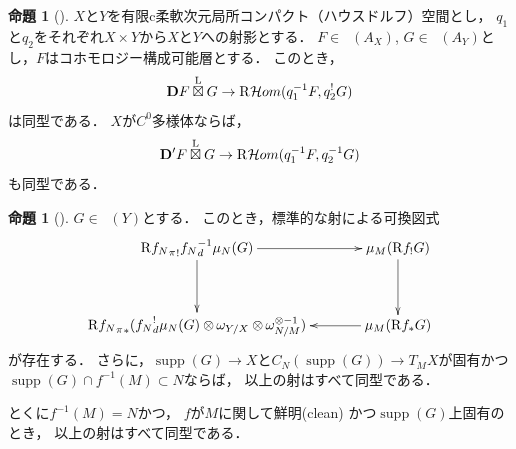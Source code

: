 \documentclass[leqno, 10pt, a4paper, dvipdfmx]{jsarticle}
\theoremstyle{definition}
\numberwithin{equation}{section}
\newcommand{\supp}{\mathop{\mathrm{supp}}\nolimits}
\newcommand{\Dompb}{\mathop{\mathsf{D}^\mathrm{b}}\nolimits}
\newcommand{\HOM}{\mathop{\mathcal{H}\hspace{-0pt}om}\nolimits}%
\newcommand{\RHOM}{\mathop{\mathrm{R}\hspace{-1.5pt}\HOM}\nolimits}
\newcommand{\Rder}{\mathrm{R}}
\newcommand{\vD}{\mathbf{D}}
\newcommand{\tens}[1][]{\mathbin{\otimes_{\raise1.5ex\hbox to-.1em{}{#1}}}}
\newcommand{\etens}{\mathbin{\boxtimes}}
\newcommand{\letens}{\overset{\mathrm{L}}{\etens}}
\theoremstyle{mystyle}
\newtheorem{PRP}[AXM]{命題}
\renewenvironment{leftbar}{%
  \def\FrameCommand{\textcolor{lightgray}{\vrule width 4pt} \hspace{10pt}}%
  \MakeFramed {\advance\hsize-\width \FrameRestore}}%
{\endMakeFramed}
\newcommand{\mpb}[1][]{{#1}_{\pi}} %
\newcommand{\mdiff}[1][]{{#1}_{d}} %
\begin{document}
\begin{leftbar}
\begin{PRP}[{\cite[Prop.3.4.4.]{KS90}}]\label{prp3.4.4}
  \(X\)と\(Y\)を有限c柔軟次元局所コンパクト（ハウスドルフ）空間とし，
  \(q_1\)と\(q_2\)をそれぞれ\(X\times Y\)から\(X\)と\(Y\)への射影とする．
  \(F\in\Dompb(A_X)\), \(G\in\Dompb(A_Y)\)とし，\(F\)はコホモロジー構成可能層とする．
  このとき，
  \[
    \vD{F}\letens G\to \RHOM(q_1^{-1}F,q_2^{!}G)
  \]は同型である．
  \(X\)が\(C^0\)多様体ならば，\[
    \vD'{F}\letens G\to \RHOM(q_1^{-1}F,q_2^{-1}G)
  \]も同型である．
\end{PRP}
\end{leftbar}

\begin{leftbar}
\begin{PRP}[{\cite[Prop.4.3.4]{KS90}}]\label{prp4.3.4}
  \(G\in\Dompb(Y)\)とする．
  このとき，標準的な射による可換図式    
  \[    
      \vcenter{\xymatrix@C=36pt@R=36pt{
      \Rder{{\mpb[f_{N}]}_{!}}{\mdiff[f_{N}]^{-1}}\mu_{N}(G)
      \ar[d]
      \ar[r]
      &
      \mu_{M}(\Rder{f_{!}}G)
      \ar[d]
      \\
      \Rder{{\mpb[f_{N}]}_{\ast}}({\mdiff[f_{N}]^{!}}\mu_{N}(G)\tens[]\omega_{Y/X}\tens[]\omega_{N/M}^{\otimes{-1}})
      &
      \mu_{M}(\Rder{f_{\ast}}G)
      \ar[l]
      }}
  \]が存在する．
  さらに，\(\supp(G)\to X\)と\(
      C_N(\supp(G))\to T_{M}X
  \)が固有かつ\(\supp(G)\cap f^{-1}(M)\subset N\)ならば，
  以上の射はすべて同型である．
  
  とくに\(f^{-1}(M)=N\)かつ，
  \(f\)が\(M\)に関して鮮明\footnotemark[2] (clean) かつ\(\supp(G)\)上固有のとき，
  以上の射はすべて同型である．
\end{PRP}
\end{leftbar}

\end{document}
